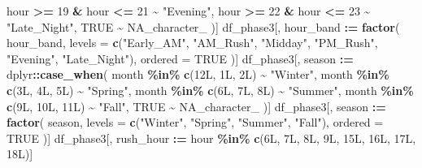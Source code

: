 \documentclass[
]{article}
\newenvironment{Shaded}{\begin{snugshade}}{\end{snugshade}}
\newcommand{\AttributeTok}[1]{\textcolor[rgb]{0.13,0.29,0.53}{#1}}
\newcommand{\ConstantTok}[1]{\textcolor[rgb]{0.56,0.35,0.01}{#1}}
\newcommand{\DataTypeTok}[1]{\textcolor[rgb]{0.13,0.29,0.53}{#1}}
\newcommand{\DecValTok}[1]{\textcolor[rgb]{0.00,0.00,0.81}{#1}}
\newcommand{\FunctionTok}[1]{\textcolor[rgb]{0.13,0.29,0.53}{\textbf{#1}}}
\newcommand{\NormalTok}[1]{#1}
\newcommand{\SpecialCharTok}[1]{\textcolor[rgb]{0.81,0.36,0.00}{\textbf{#1}}}
\newcommand{\StringTok}[1]{\textcolor[rgb]{0.31,0.60,0.02}{#1}}
\begin{document}
\begin{Shaded}
\begin{Highlighting}[]
\NormalTok{  hour }\SpecialCharTok{\textgreater{}=} \DecValTok{19} \SpecialCharTok{\&}\NormalTok{ hour }\SpecialCharTok{\textless{}=} \DecValTok{21} \SpecialCharTok{\textasciitilde{}} \StringTok{"Evening"}\NormalTok{,}
\NormalTok{  hour }\SpecialCharTok{\textgreater{}=} \DecValTok{22} \SpecialCharTok{\&}\NormalTok{ hour }\SpecialCharTok{\textless{}=} \DecValTok{23} \SpecialCharTok{\textasciitilde{}} \StringTok{"Late\_Night"}\NormalTok{,}
  \ConstantTok{TRUE} \SpecialCharTok{\textasciitilde{}} \ConstantTok{NA\_character\_}
\NormalTok{)]}
\NormalTok{df\_phase3[, hour\_band }\SpecialCharTok{:=} \FunctionTok{factor}\NormalTok{(}
\NormalTok{  hour\_band,}
  \AttributeTok{levels =} \FunctionTok{c}\NormalTok{(}\StringTok{"Early\_AM"}\NormalTok{, }\StringTok{"AM\_Rush"}\NormalTok{, }\StringTok{"Midday"}\NormalTok{, }\StringTok{"PM\_Rush"}\NormalTok{, }\StringTok{"Evening"}\NormalTok{, }\StringTok{"Late\_Night"}\NormalTok{),}
  \AttributeTok{ordered =} \ConstantTok{TRUE}
\NormalTok{)]}
\NormalTok{df\_phase3[, season }\SpecialCharTok{:=}\NormalTok{ dplyr}\SpecialCharTok{::}\FunctionTok{case\_when}\NormalTok{(}
\NormalTok{  month }\SpecialCharTok{\%in\%} \FunctionTok{c}\NormalTok{(}\DecValTok{12}\DataTypeTok{L}\NormalTok{, }\DecValTok{1}\DataTypeTok{L}\NormalTok{, }\DecValTok{2}\DataTypeTok{L}\NormalTok{) }\SpecialCharTok{\textasciitilde{}} \StringTok{"Winter"}\NormalTok{,}
\NormalTok{  month }\SpecialCharTok{\%in\%} \FunctionTok{c}\NormalTok{(}\DecValTok{3}\DataTypeTok{L}\NormalTok{, }\DecValTok{4}\DataTypeTok{L}\NormalTok{, }\DecValTok{5}\DataTypeTok{L}\NormalTok{) }\SpecialCharTok{\textasciitilde{}} \StringTok{"Spring"}\NormalTok{,}
\NormalTok{  month }\SpecialCharTok{\%in\%} \FunctionTok{c}\NormalTok{(}\DecValTok{6}\DataTypeTok{L}\NormalTok{, }\DecValTok{7}\DataTypeTok{L}\NormalTok{, }\DecValTok{8}\DataTypeTok{L}\NormalTok{) }\SpecialCharTok{\textasciitilde{}} \StringTok{"Summer"}\NormalTok{,}
\NormalTok{  month }\SpecialCharTok{\%in\%} \FunctionTok{c}\NormalTok{(}\DecValTok{9}\DataTypeTok{L}\NormalTok{, }\DecValTok{10}\DataTypeTok{L}\NormalTok{, }\DecValTok{11}\DataTypeTok{L}\NormalTok{) }\SpecialCharTok{\textasciitilde{}} \StringTok{"Fall"}\NormalTok{,}
  \ConstantTok{TRUE} \SpecialCharTok{\textasciitilde{}} \ConstantTok{NA\_character\_}
\NormalTok{)]}
\NormalTok{df\_phase3[, season }\SpecialCharTok{:=} \FunctionTok{factor}\NormalTok{(}
\NormalTok{  season,}
  \AttributeTok{levels =} \FunctionTok{c}\NormalTok{(}\StringTok{"Winter"}\NormalTok{, }\StringTok{"Spring"}\NormalTok{, }\StringTok{"Summer"}\NormalTok{, }\StringTok{"Fall"}\NormalTok{),}
  \AttributeTok{ordered =} \ConstantTok{TRUE}
\NormalTok{)]}
\NormalTok{df\_phase3[, rush\_hour }\SpecialCharTok{:=}\NormalTok{ hour }\SpecialCharTok{\%in\%} \FunctionTok{c}\NormalTok{(}\DecValTok{6}\DataTypeTok{L}\NormalTok{, }\DecValTok{7}\DataTypeTok{L}\NormalTok{, }\DecValTok{8}\DataTypeTok{L}\NormalTok{, }\DecValTok{9}\DataTypeTok{L}\NormalTok{, }\DecValTok{15}\DataTypeTok{L}\NormalTok{, }\DecValTok{16}\DataTypeTok{L}\NormalTok{, }\DecValTok{17}\DataTypeTok{L}\NormalTok{, }\DecValTok{18}\DataTypeTok{L}\NormalTok{)]}


\end{Highlighting}
\end{Shaded}
\end{document}
